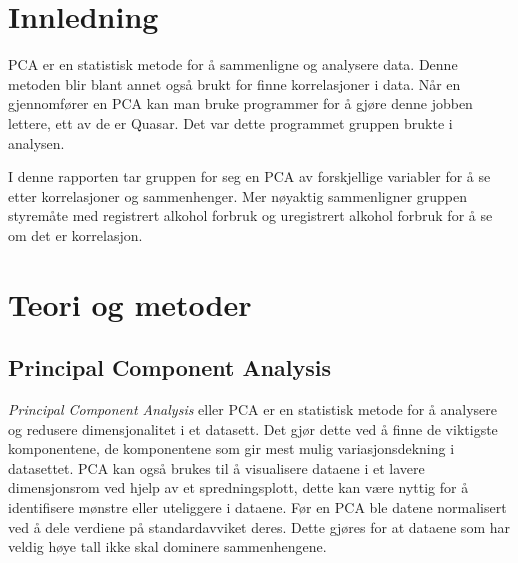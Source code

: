 \documentclass[twocolumn, 11pt]{article} %
\begin{document}
\section{Innledning} 
    PCA er en statistisk metode for å sammenligne og analysere data. Denne metoden blir blant annet også brukt for finne korrelasjoner i data. Når en gjennomfører en PCA kan man bruke programmer for å gjøre denne jobben lettere, ett av de er Quasar. Det var dette programmet gruppen brukte i analysen.
    
    I denne rapporten tar gruppen for seg en PCA av forskjellige variabler for å se etter korrelasjoner og sammenhenger. Mer nøyaktig sammenligner gruppen styremåte med registrert alkohol forbruk og uregistrert alkohol forbruk for å se om det er korrelasjon.

    
\section{Teori og metoder}
\subsection{Principal Component Analysis}
\textit{Principal Component Analysis} eller PCA er en statistisk metode for å analysere og redusere dimensjonalitet i et datasett. Det gjør dette ved å finne de viktigste komponentene, de komponentene som gir mest mulig variasjonsdekning i datasettet. PCA kan også brukes til å visualisere dataene i et lavere dimensjonsrom ved hjelp av et spredningsplott, dette kan være nyttig for å identifisere mønstre eller uteliggere i dataene.\cite{youtube} Før en PCA ble datene normalisert ved å dele verdiene på standardavviket deres. Dette gjøres for at dataene som har veldig høye tall ikke skal dominere sammenhengene. 
\end{document}
